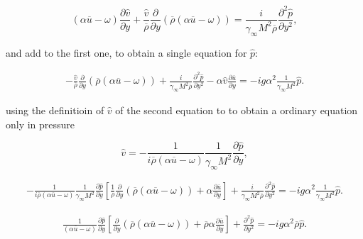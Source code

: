 \begin{equation*} 
\left(
    \alpha 
    \overline{u}
    -
    \omega 
\right)
\frac{\partial \hat{v}}{\partial y}
+
\frac{\hat{v}}{\overline{\rho}}
\frac{\partial }{\partial y}
\left(
\overline{\rho}
\left(
    \alpha 
    \overline{u}
    -
    \omega 
\right)
\right)
=
\frac{i}{\gamma_{\infty} M^{2}\overline{\rho}}
\frac{\partial^2 \hat{p}}{\partial y^2}
,
\end{equation*} 

and add to the first one, 
to obtain a single equation for $\hat{p}$:

\begin{equation} 
\begin{split}
-
\frac{\hat{v}}{\overline{\rho}}
\frac{\partial }{\partial y}
\left(
\overline{\rho}
\left(
    \alpha 
    \overline{u}
    -
    \omega 
\right)
\right)
+
\frac{i}{\gamma_{\infty} M^{2}\overline{\rho}}
\frac{\partial^2 \hat{p}}{\partial y^2}
-
\alpha
\hat{v}
\frac{\partial\overline{u}}{\partial y}
=
-
i
g\alpha^2
\frac{1}{\gamma_{\infty} M^{2}}
\hat{p}
.
\end{split}
\end{equation} 

using the definitioin of $\hat{v}$ of the second equation to 
to obtain a ordinary equation only in pressure  

\begin{equation*} 
\hat{v}
=
-
\frac{1}{
i
\overline{\rho}
\left(\alpha \overline{u}-\omega \right)
}
\frac{1}{\gamma_{\infty} M^{2}}
\frac{\partial \hat{p}}{\partial y}
,
\end{equation*} 

\begin{equation} 
\begin{split}
-
    \frac{1}{
    i
    \overline{\rho}
    \left(\alpha \overline{u}-\omega \right)
    }
    \frac{1}{\gamma_{\infty} M^{2}}
    \frac{\partial \hat{p}}{\partial y}
\left[
    \frac{1}{\overline{\rho}}
    \frac{\partial }{\partial y}
    \left(
    \overline{\rho}
    \left(
        \alpha 
        \overline{u}
        -
        \omega 
    \right)
    \right)
    +
    \alpha
    \frac{\partial\overline{u}}{\partial y}
\right]
+
\frac{i}{\gamma_{\infty} M^{2}\overline{\rho}}
\frac{\partial^2 \hat{p}}{\partial y^2}
=
-
i
g\alpha^2
\frac{1}{\gamma_{\infty} M^{2}}
\hat{p}
.
\end{split}
\end{equation} 

\begin{equation} 
\begin{split}
    \frac{1}{
    \left(\alpha \overline{u}-\omega \right)
    }
    \frac{\partial \hat{p}}{\partial y}
\left[
    \frac{\partial }{\partial y}
    \left(
    \overline{\rho}
    \left(
        \alpha 
        \overline{u}
        -
        \omega 
    \right)
    \right)
    +
    \overline{\rho}
    \alpha
    \frac{\partial\overline{u}}{\partial y}
\right]
+
\frac{\partial^2 \hat{p}}{\partial y^2}
=
-
i
g\alpha^2
\overline{\rho}
\hat{p}
.
\end{split}
\end{equation} 

